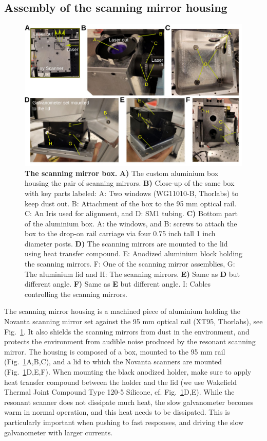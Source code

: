 \documentclass[10pt,letterpaper]{article}
\begin{document}
\subsection{Assembly of the scanning mirror housing}
%
\begin{figure}[!t]
    \includegraphics[width=\textwidth]{sfig10.jpg}
    \caption{{\bf The scanning mirror box.} \textbf{A)} The custom aluminium box housing the pair of scanning mirrors. \textbf{B)} Close-up of the same box with key parts labeled: A: Two windows (WG11010-B, Thorlabs) to keep dust out. B: Attachment of the box to the 95 mm optical rail. C: An Iris used for alignment, and D: SM1 tubing. \textbf{C)} Bottom part of the aluminium box. A: the windows, and B: screws to attach the box to the drop-on rail carriage via four 0.75 inch tall 1 inch diameter posts. \textbf{D)} The scanning mirrors are mounted to the lid using heat transfer compound. E: Anodized aluminium block holding the scanning mirrors. F: One of the scanning mirror assemblies, G: The aluminium lid and H: The scanning mirrors. \textbf{E)} Same as \textbf{D} but different angle. \textbf{F)} Same as \textbf{E} but different angle. I: Cables controlling the scanning mirrors.}
    \label{sfig10}
\end{figure}
%
The scanning mirror housing is a machined piece of aluminium holding the Novanta scanning mirror set against the 95 mm optical rail (XT95, Thorlabs), see Fig.~\ref{sfig10}. It also shields the scanning mirrors from dust in the environment, and protects the environment from audible noise produced by the resonant scanning mirror. The housing is composed of a box, mounted to the 95 mm rail (Fig.~\ref{sfig10}A,B,C), and a lid to which the Novanta scanners are mounted (Fig.~\ref{sfig10}D,E,F). When mounting the black anodized holder, make sure to apply heat transfer compound between the holder and the lid (we use Wakefield Thermal Joint Compound Type 120-5 Silicone, cf. Fig.~\ref{sfig10}D,E). While the resonant scanner does not dissipate much heat, the slow galvanometer becomes warm in normal operation, and this heat needs to be dissipated. This is particularly important when pushing to fast responses, and driving the slow galvanometer with larger currents.\newline
\end{document}
